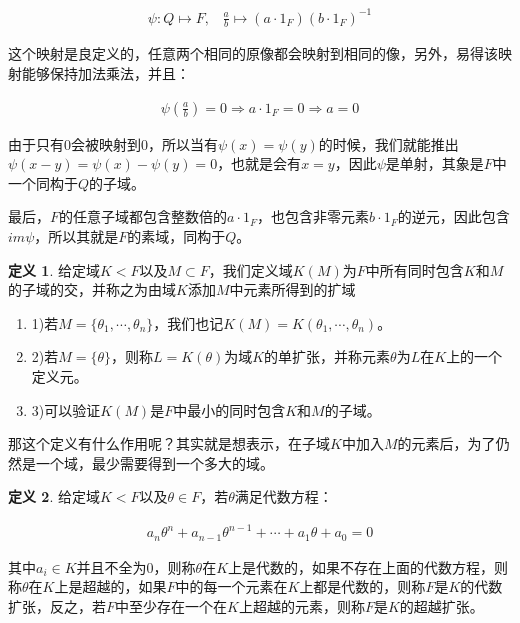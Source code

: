 \documentclass[12pt, a4paper, oneside]{ctexart}
\theoremstyle{definition}
\newtheorem*{definition}{定义}
\begin{document}
\begin{align*}
\psi:Q\mapsto F,\;\;\; \frac{a}{b}\mapsto (a\cdot 1_F)(b\cdot 1_F)^{-1}
\end{align*}

这个映射是良定义的，任意两个相同的原像都会映射到相同的像，另外，易得该映射能够保持加法乘法，并且：

\begin{align*}
\psi(\frac{a}{b})=0\Rightarrow a\cdot1_F=0\Rightarrow a=0
\end{align*}

由于只有0会被映射到0，所以当有$\psi(x)=\psi(y)$的时候，我们就能推出$\psi(x-y)=\psi(x)-\psi(y)=0$，也就是会有$x=y$，因此$\psi$是单射，其象是$F$中一个同构于$Q$的子域。

最后，$F$的任意子域都包含整数倍的$a\cdot 1_F$，也包含非零元素$b\cdot 1_F$的逆元，因此包含$im \psi$，所以其就是$F$的素域，同构于$Q$。

\begin{definition}
给定域$K<F$以及$M\subset F$，我们定义域$K(M)$为$F$中所有同时包含$K$和$M$的子域的交，并称之为由域$K$添加$M$中元素所得到的扩域

\begin{enumerate}
\item 1)若$M=\{\theta_1,\cdots,\theta_n\}$，我们也记$K(M)=K(\theta_1,\cdots,\theta_n)$。
\item 2)若$M=\{\theta\}$，则称$L=K(\theta)$为域$K$的单扩张，并称元素$\theta$为$L$在$K$上的一个定义元。
\item 3)可以验证$K(M)$是$F$中最小的同时包含$K$和$M$的子域。
\end{enumerate}
\end{definition}

那这个定义有什么作用呢？其实就是想表示，在子域$K$中加入$M$的元素后，为了仍然是一个域，最少需要得到一个多大的域。

\begin{definition}
给定域$K<F$以及$\theta\in F$，若$\theta$满足代数方程：

\begin{align*}
a_n\theta^n+a_{n-1}\theta^{n-1}+\cdots+a_1\theta+a_0=0
\end{align*}

其中$a_i\in K$并且不全为0，则称$\theta$在$K$上是代数的，如果不存在上面的代数方程，则称$\theta$在$K$上是超越的，如果$F$中的每一个元素在$K$上都是代数的，则称$F$是$K$的代数扩张，反之，若$F$中至少存在一个在$K$上超越的元素，则称$F$是$K$的超越扩张。
\end{definition}
\end{document}
